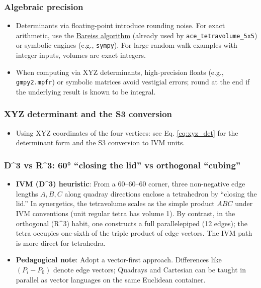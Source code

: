 \documentclass[
  10pt,
]{article}
\providecommand{\tightlist}{%
  \setlength{\itemsep}{0pt}\setlength{\parskip}{0pt}}
\begin{document}
\hypertarget{algebraic-precision}{%
\subsubsection{Algebraic precision}\label{algebraic-precision}}

\begin{itemize}
\tightlist
\item
  Determinants via floating-point introduce rounding noise. For exact
  arithmetic, use the
  \href{https://en.wikipedia.org/wiki/Bareiss_algorithm}{Bareiss
  algorithm} (already used by \texttt{ace\_tetravolume\_5x5}) or
  symbolic engines (e.g., \texttt{sympy}). For large random-walk
  examples with integer inputs, volumes are exact integers.
\item
  When computing via XYZ determinants, high-precision floats (e.g.,
  \texttt{gmpy2.mpfr}) or symbolic matrices avoid vestigial errors;
  round at the end if the underlying result is known to be integral.
\end{itemize}

\hypertarget{xyz-determinant-and-the-s3-conversion}{%
\subsubsection{XYZ determinant and the S3
conversion}\label{xyz-determinant-and-the-s3-conversion}}

\begin{itemize}
\tightlist
\item
  Using XYZ coordinates of the four vertices: see Eq. \eqref{eq:xyz_det}
  for the determinant form and the S3 conversion to IVM units.
\end{itemize}

\hypertarget{d3-vs-r3-60-closing-the-lid-vs-orthogonal-cubing}{%
\subsubsection{D\^{}3 vs R\^{}3: 60° ``closing the lid'' vs orthogonal
``cubing''}\label{d3-vs-r3-60-closing-the-lid-vs-orthogonal-cubing}}

\begin{itemize}
\tightlist
\item
  \textbf{IVM (D\^{}3) heuristic}: From a 60--60--60 corner, three
  non-negative edge lengths \(A,B,C\) along quadray directions enclose a
  tetrahedron by ``closing the lid.'' In synergetics, the tetravolume
  scales as the simple product \(ABC\) under IVM conventions (unit
  regular tetra has volume 1). By contrast, in the orthogonal (R\^{}3)
  habit, one constructs a full parallelepiped (12 edges); the tetra
  occupies one-sixth of the triple product of edge vectors. The IVM path
  is more direct for tetrahedra.
\item
  \textbf{Pedagogical note}: Adopt a vector-first approach. Differences
  like \((P_i-P_0)\) denote edge vectors; Quadrays and Cartesian can be
  taught in parallel as vector languages on the same Euclidean
  container.
\end{itemize}
\end{document}

